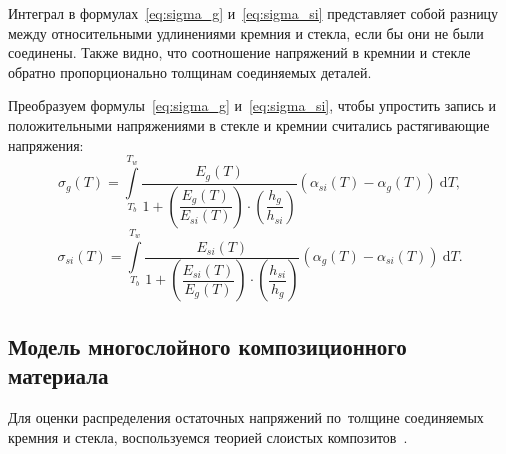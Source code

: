Интеграл в формулах~\eqref{eq:sigma_g} и~\eqref{eq:sigma_si} представляет собой разницу между относительными удлинениями кремния и стекла, если бы они не были соединены. Также видно, что соотношение напряжений в кремнии и стекле обратно пропорционально толщинам соединяемых деталей.

Преобразуем формулы~\eqref{eq:sigma_g} и~\eqref{eq:sigma_si}, чтобы упростить запись и положительными напряжениями в стекле и кремнии считались растягивающие напряжения:%
\[
    \sigma_g(T)
    =
    \int\limits_{T_b}^{T_w}
    \frac{E_g(T)}%
        {1 +
            \left(
                \dfrac{E_g(T)}{E_{si}(T)}
            \right)
        \cdot
            \left(
                \dfrac{h_g}{h_{si}}
            \right)
        }
    (
        \alpha_{si}(T) - \alpha_g(T)
    )
    \:\mathrm{d}T,
\]
\begin{equation}
    \label{eq:sigma_siupdated}
    \sigma_{si}(T)
    =
    \int\limits_{T_b}^{T_w}
    \frac{E_{si}(T)}%
        {1 +
            \left(
                \dfrac{E_{si}(T)}{E_g(T)}
            \right)
        \cdot
            \left(
                \dfrac{h_{si}}{h_g}
            \right)
        }
    (
         \alpha_g(T) - \alpha_{si}(T)
    )
    \:\mathrm{d}T.
\end{equation}

\subsection{Модель многослойного композиционного материала}

Для оценки распределения остаточных напряжений по~толщине соединяемых
кремния и стекла, воспользуемся теорией слоистых
композитов~\cite{gigliotti2007assessment}.%


